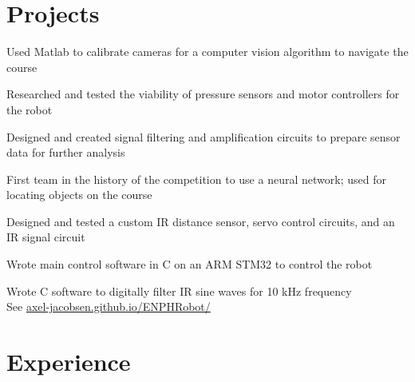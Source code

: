 \documentclass[]{deedy-resume-openfont}
\begin{document}

\section{Projects}
\begin{tightemize}
	\item Used Matlab to calibrate cameras for a computer vision algorithm to navigate the course
	\item Researched and tested the viability of pressure sensors and motor controllers for the robot
	\item Designed and created signal filtering and amplification circuits to prepare sensor data for further analysis
\end{tightemize}
\vspace{8pt}

\begin{tightemize}
	\item First team in the history of the competition to use a neural network; used for locating objects on the course
	\item Designed and tested a custom IR distance sensor, servo control circuits, and an IR signal circuit
	\item Wrote main control software in C on an ARM STM32 to control the robot
	\item Wrote C software to digitally filter IR sine waves for 10 kHz frequency \\
	See \href{https://axel-jacobsen.github.io/ENPHRobot/}{axel-jacobsen.github.io/ENPHRobot/}
\end{tightemize}
\vspace{10pt}

\section{Experience}
\end{document}

